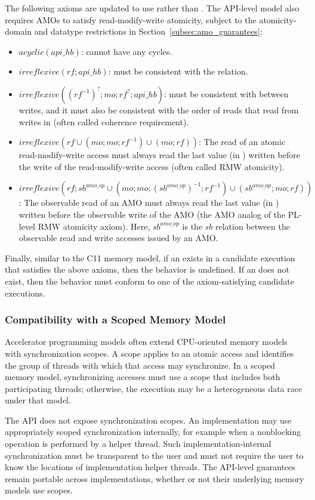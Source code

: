 The following axioms are updated to use \relAHB{} rather than \relHB{}. The API-level
    model also requires \openshmem \ac{AMO}s to satisfy read-modify-write atomicity,
    subject to the atomicity-domain and datatype restrictions in
    Section~\ref{subsec:amo_guarantees}:
\begin{itemize}
    \item $acyclic(api\_hb)$: \relAHB{} cannot have any cycles.
    \item $irreflexive(rf;api\_hb)$: \relAHB{} must be consistent with the \relRF{}
        relation.
    \item $irreflexive((rf^{-1})^{?};mo;rf^?;api\_hb)$: \relAHB{} must be consistent
        with \relMO{} between writes, and it must also be consistent with the order of
        reads that read from writes in \relMO{} (often called coherence requirement).
    \item $irreflexive(rf \cup (mo;mo;rf^{-1}) \cup (mo;rf))$: The read of an atomic
        read-modify-write access must always read the last value (in \relMO{}) written
        before the write of the read-modify-write access (often called RMW atomicity).
    \item $irreflexive(rf;sb^{amo\_op} \cup (mo;mo;(sb^{amo\_op})^{-1};rf^{-1}) \cup
        (sb^{amo\_op};mo;rf))$: The observable read of an \openshmem \ac{AMO} must
        always read the last value (in \relMO{}) written before the observable write of
        the \ac{AMO} (the \ac{AMO} analog of the PL-level RMW atomicity axiom). Here,
        $sb^{amo\_op}$ is the $sb$ relation between the observable read and write
        accesses issued by an \ac{AMO}.
\end{itemize}

Finally, similar to the C11 memory model, if an \relADR{} exists in a candidate
    execution that satisfies the above axioms, then the behavior is undefined. If an
    \relADR{} does not exist, then the behavior must conform to one of the
    axiom-satisfying candidate executions.

\subsubsection{Compatibility with a Scoped Memory Model}\label{subsubsec:api_scoped}

Accelerator programming models often extend CPU-oriented memory models with
    synchronization scopes. A scope applies to an atomic access and identifies the group
    of threads with which that access may synchronize. In a scoped memory model,
    synchronizing accesses must use a scope that includes both participating threads;
    otherwise, the execution may be a heterogeneous data race under that model.

The \openshmem API does not expose synchronization scopes. An implementation may use
    appropriately scoped synchronization internally, for example when a nonblocking
    operation is performed by a helper thread. Such implementation-internal
    synchronization must be transparent to the user and must not require the user to
    know the locations of implementation helper threads. The API-level guarantees remain
    portable across implementations, whether or not their underlying memory models use
    scopes.
